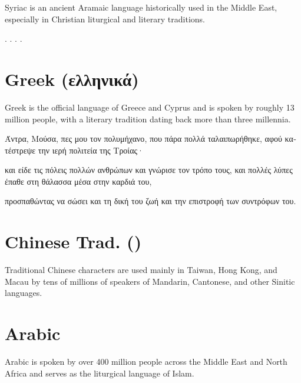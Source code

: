 \documentclass[a4paper,twoside]{article}
\begin{document}
Syriac is an ancient Aramaic language historically used in the Middle East, especially in Christian liturgical and literary traditions.

. . . .

\section{Greek (\textgreek{ελληνικά})}\label{greek-ellenika}

Greek is the official language of Greece and Cyprus and is spoken by roughly 13 million people, with a literary tradition dating back more than three millennia.

\textgreek{Άντρα}, \textgreek{Μούσα}, \textgreek{πες μου τον πολυμήχανο}, \textgreek{που πάρα πολλά
ταλαιπωρήθηκε}, \textgreek{αφού κατέστρεψε την ιερή πολιτεία της Τροίας}·

\textgreek{και είδε τις πόλεις πολλών ανθρώπων και γνώρισε τον τρόπο τους},
\textgreek{και πολλές λύπες έπαθε στη θάλασσα μέσα στην καρδιά του},

\textgreek{προσπαθώντας να σώσει και τη δική του ζωή
και την επιστροφή των συντρόφων του}.

\section{Chinese Trad. ()}\label{chinese-trad-fan-ti-zhong-wen}

Traditional Chinese characters are used mainly in Taiwan, Hong Kong, and Macau by tens of millions of speakers of Mandarin, Cantonese, and other Sinitic languages.


\section{Arabic}\label{arabic}

Arabic is spoken by over 400 million people across the Middle East and North Africa and serves as the liturgical language of Islam.
\end{document}
